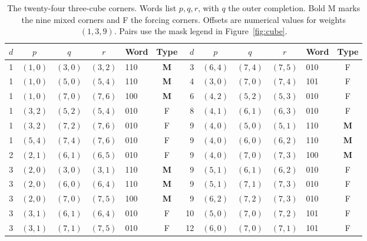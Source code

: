 \documentclass[11pt,a4paper]{article}
\theoremstyle{definition}
\numberwithin{equation}{section}
\begin{document}
\begin{table}[!htbp]
	\centering
	\caption{The twenty-four three-cube corners. Words list $p,q,r$, with $q$ the outer completion. Bold M marks the nine mixed corners and F the forcing corners. Offsets are numerical values for weights $(1,3,9)$. Pairs use the mask legend in Figure~\ref{fig:cube}.}
	\label{tab:threecorners}
	\begin{tabular}{@{}rccclc@{\quad}rccclc@{}}
		\toprule $d$&$p$&$q$&$r$&Word&Type&$d$&$p$&$q$&$r$&Word&Type\\\midrule
		1&$(1,0)$&$(3,0)$&$(3,2)$&110&\textbf{M}&3&$(6,4)$&$(7,4)$&$(7,5)$&010&F\\
		1&$(1,0)$&$(5,0)$&$(5,4)$&110&\textbf{M}&4&$(3,0)$&$(7,0)$&$(7,4)$&101&F\\
		1&$(1,0)$&$(7,0)$&$(7,6)$&100&\textbf{M}&6&$(4,2)$&$(5,2)$&$(5,3)$&010&F\\
		1&$(3,2)$&$(5,2)$&$(5,4)$&010&F&8&$(4,1)$&$(6,1)$&$(6,3)$&010&F\\
		1&$(3,2)$&$(7,2)$&$(7,6)$&010&F&9&$(4,0)$&$(5,0)$&$(5,1)$&110&\textbf{M}\\
		1&$(5,4)$&$(7,4)$&$(7,6)$&010&F&9&$(4,0)$&$(6,0)$&$(6,2)$&110&\textbf{M}\\
		2&$(2,1)$&$(6,1)$&$(6,5)$&010&F&9&$(4,0)$&$(7,0)$&$(7,3)$&100&\textbf{M}\\
		3&$(2,0)$&$(3,0)$&$(3,1)$&110&\textbf{M}&9&$(5,1)$&$(6,1)$&$(6,2)$&010&F\\
		3&$(2,0)$&$(6,0)$&$(6,4)$&110&\textbf{M}&9&$(5,1)$&$(7,1)$&$(7,3)$&010&F\\
		3&$(2,0)$&$(7,0)$&$(7,5)$&100&\textbf{M}&9&$(6,2)$&$(7,2)$&$(7,3)$&010&F\\
		3&$(3,1)$&$(6,1)$&$(6,4)$&010&F&10&$(5,0)$&$(7,0)$&$(7,2)$&101&F\\
		3&$(3,1)$&$(7,1)$&$(7,5)$&010&F&12&$(6,0)$&$(7,0)$&$(7,1)$&101&F\\\bottomrule
	\end{tabular}
\end{table}

\FloatBarrier
\end{document}
